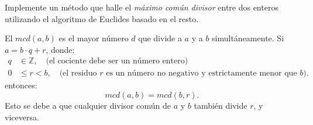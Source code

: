 Implemente un método que halle el \textit{máximo común divisor} entre dos enteros utilizando el algoritmo de Euclides basado en el resto.

El \(mcd(a, b)\) es el mayor número \(d\) que divide a \(a\) y a \(b\) simultáneamente. Si \(a = b \cdot q + r\), donde:
\[
\begin{aligned}
q &\in \mathbb{Z}, \quad \text{(el cociente debe ser un número entero)} \\
0 &\leq r < b, \quad \text{(el residuo \(r\) es un número no negativo y estrictamente menor que \(b\))}.
\end{aligned}
\]
entonces:
\[
mcd(a, b) = mcd(b, r).
\]
Esto se debe a que cualquier divisor común de \(a\) y \(b\) también divide \(r\), y viceversa.
